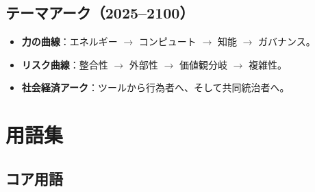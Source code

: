 \documentclass[11pt]{article}
\begin{document}
\subsection{テーマアーク（2025–2100）}
\begin{itemize}[noitemsep]
  \item \textbf{力の曲線}：エネルギー $\rightarrow$ コンピュート $\rightarrow$ 知能 $\rightarrow$ ガバナンス。
  \item \textbf{リスク曲線}：整合性 $\rightarrow$ 外部性 $\rightarrow$ 価値観分岐 $\rightarrow$ 複雑性。
  \item \textbf{社会経済アーク}：ツールから行為者へ、そして共同統治者へ。
\end{itemize}

\clearpage

\section*{用語集}

\subsection*{コア用語}
\end{document}
